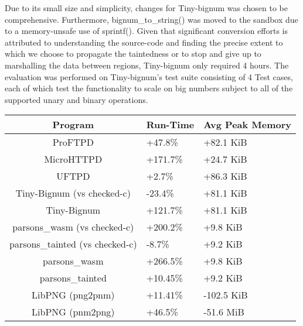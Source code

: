 Due to its small size and simplicity, \systemname changes for Tiny-bignum was chosen to be comprehensive. Furthermore, bignum\_to\_string() was moved to the sandbox due to a memory-unsafe use of sprintf(). Given that significant \systemname conversion efforts is attributed to understanding the source-code and finding the precise extent to which we choose to propagate the taintedness or to stop and give up to marshalling the data between regions, Tiny-bignum only required 4 hours. The evaluation was performed on Tiny-bignum's test suite consisting of 4 Test cases, each of which test the functionality to scale on big numbers subject to all of the supported unary and binary operations.  

\begin{center}
\label{fig:prgrbenchmarks}
\begin{tabular}{||c | p{1.3cm} | p{1.8cm}||} 
 \hline
 Program & Run-Time & Avg Peak Memory \\ [0.5ex] 
 \hline\hline
 ProFTPD & +47.8\% & +82.1 KiB  \\
 MicroHTTPD & +171.7\% & +24.7 KiB\\ 
 UFTPD & +2.7\% & +86.3 KiB \\ 
 Tiny-Bignum (vs checked-c) & -23.4\% &  +81.1 KiB \\
 Tiny-Bignum &  +121.7\% &  +81.1 KiB \\
 parsons\_wasm (vs checked-c) & +200.2\% & +9.8 KiB\\ 
 parsons\_tainted (vs checked-c) & -8.7\% & +9.2 KiB\\
 parsons\_wasm & +266.5\% & +9.8 KiB\\ 
 parsons\_tainted & +10.45\% & +9.2 KiB\\ 
 LibPNG (png2pnm) & +11.41\% & -102.5 KiB\\ 
 LibPNG (pnm2png) & +46.5\% & -51.6 MiB\\ [1ex]
 \hline 

\end{tabular}
\end{center}


